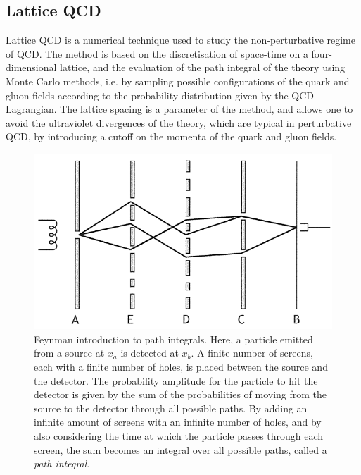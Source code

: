 \subsection{Lattice QCD}
Lattice QCD is a numerical technique used to study the non-perturbative regime of QCD. The method is based on the discretisation of space-time on a four-dimensional lattice, and the evaluation of the path integral of the theory using Monte Carlo methods, i.e. by sampling possible configurations of the quark and gluon fields according to the probability distribution given by the QCD Lagrangian. The lattice spacing is a parameter of the method, and allows one to avoid the ultraviolet divergences of the theory, which are typical in perturbative QCD, by introducing a cutoff on the momenta of the quark and gluon fields. 
\begin{figure}[htb]
  \centering
  \includegraphics[width=0.7\linewidth]{Figures/Chapter 1/PathIntegrals.png}
  \caption{Feynman introduction to path integrals. Here, a particle emitted from a source at $x_a$ is detected at $x_b$. A finite number of screens, each with a finite number of holes, is placed between the source and the detector. The probability amplitude for the particle to hit the detector is given by the sum of the probabilities of moving from the source to the detector through all possible paths. By adding an infinite amount of screens with an infinite number of holes, and by also considering the time at which the particle passes through each screen, the sum becomes an integral over all possible paths, called a \emph{path integral}.}
  \label{fig:PathIntegrals}
\end{figure}


